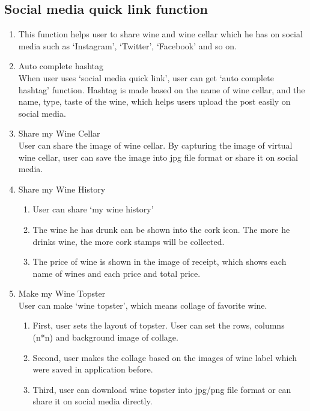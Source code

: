 \documentclass[conference]{IEEEtran}
\numberwithin{figure}{subsection}
\begin{document}
\subsection{\textbf{Social media quick link function}}
\begin{enumerate}
    \item This function helps user to share wine and wine cellar which he has on social media such as ‘Instagram’, ‘Twitter’, ‘Facebook’ and so on.
    \item Auto complete hashtag\\
    When user uses ‘social media quick link’, user can get ‘auto complete hashtag’ function. Hashtag is made based on the name of wine cellar, and the name, type, taste of the wine, which helps users upload the post easily on social media.
    \item Share my Wine Cellar\\
    User can share the image of wine cellar. By capturing the image of virtual wine cellar, user can save the image into jpg file format or share it on social media.
    \item Share my Wine History
    \begin{enumerate}
        \item User can share ‘my wine history’
        \item The wine he has drunk can be shown into the cork icon. The more he drinks wine, the more cork stamps will be collected.
        \item The price of wine is shown in the image of receipt, which shows each name of wines and each price and total price.
    \end{enumerate}
    \item Make my Wine Topster\\
    User can make ‘wine topster’, which means collage of favorite wine.
    \begin{enumerate}
        \item First, user sets the layout of topster. User can set the rows, columns (n*n) and background image of collage.
        \item Second, user makes the collage based on the images
        of wine label which were saved in application before.
        \item Third, user can download wine topster into jpg/png
        file format or can share it on social media directly.
    \end{enumerate}
\end{enumerate}
\end{document}
